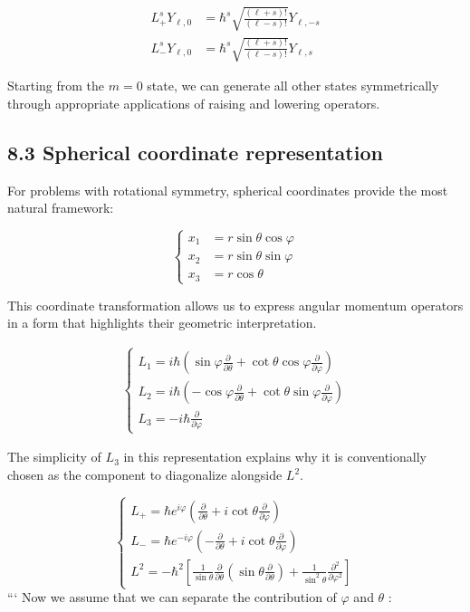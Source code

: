 \documentclass[10pt]{article}
\begin{document}
\begin{align*}
L_{+}^{s} Y_{\ell, 0} & =\hbar^{s} \sqrt{\frac{(\ell+s)!}{(\ell-s)!}} Y_{\ell,-s} \\
L_{-}^{s} Y_{\ell, 0} & =\hbar^{s} \sqrt{\frac{(\ell+s)!}{(\ell-s)!}} Y_{\ell, s} \tag{8.28}
\end{align*}

Starting from the $m=0$ state, we can generate all other states symmetrically through appropriate applications of raising and lowering operators.

\subsection*{8.3 Spherical coordinate representation}
For problems with rotational symmetry, spherical coordinates provide the most natural framework:

\[
\begin{cases}x_{1} & =r \sin \theta \cos \varphi  \tag{8.29}\\ x_{2} & =r \sin \theta \sin \varphi \\ x_{3} & =r \cos \theta\end{cases}
\]

This coordinate transformation allows us to express angular momentum operators in a form that highlights their geometric interpretation.

\begin{align}
\left\{\begin{array}{l}
L_{1} = i \hbar\left(\sin \varphi \frac{\partial}{\partial \theta}+\cot \theta \cos \varphi \frac{\partial}{\partial \varphi}\right)  \tag{8.30}\\
L_{2} = i \hbar\left(-\cos \varphi \frac{\partial}{\partial \theta}+\cot \theta \sin \varphi \frac{\partial}{\partial \varphi}\right) \\
L_{3} = -i \hbar \frac{\partial}{\partial \varphi}
\end{array}\right.
\end{align}

The simplicity of $L_3$ in this representation explains why it is conventionally chosen as the component to diagonalize alongside $L^2$.

\[
\left\{\begin{array}{l}
L_{+}=\hbar e^{i \varphi}\left(\frac{\partial}{\partial \theta}+i \cot \theta \frac{\partial}{\partial \varphi}\right)  \tag{8.31}\\
L_{-}=\hbar e^{-i \varphi}\left(-\frac{\partial}{\partial \theta}+i \cot \theta \frac{\partial}{\partial \varphi}\right) \\
L^{2}=-\hbar^{2}\left[\frac{1}{\sin \theta} \frac{\partial}{\partial \theta}\left(\sin \theta \frac{\partial}{\partial \theta}\right)+\frac{1}{\sin ^{2} \theta} \frac{\partial^{2}}{\partial \varphi^{2}}\right]
\end{array}\right.
\]
```
Now we assume that we can separate the contribution of $\varphi$ and $\theta$ :
\end{document}
